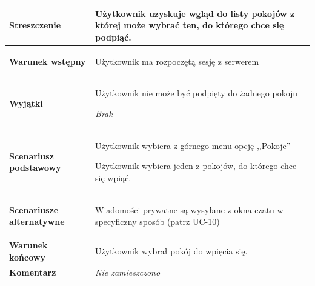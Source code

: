 {\begin{tabular}{ | l | l | }
	\hline
		\parbox[t]{4cm}{\textbf{Streszczenie}} & \parbox[t]{11cm}{
			Użytkownik uzyskuje wgląd do listy pokojów z której może
			wybrać ten, do którego chce się podpiąć.
			
		}\\
		
	\hline
		\parbox[t]{4cm}{\textbf{Warunek wstępny}} & \parbox[t]{11cm}{
			\begin{enumreq}
				\item Użytkownik ma rozpoczętą sesję z serwerem
			\end{enumreq}
				
		}
		\\
		
	\hline
		\parbox[t]{4cm}{\textbf{Wyjątki}} & \parbox[t]{11cm}{
			\begin{enumreq}
				\item Użytkownik nie może być podpięty do żadnego pokoju
			\end{enumreq}
			\textit{Brak}
			
		}
		\\

	\hline
		\parbox[t]{4cm}{\textbf{Scenariusz podstawowy}} & \parbox[t]{11cm}{
			\begin{enumreq}
				\item Użytkownik wybiera z górnego menu opcję ,,Pokoje''
				\item Użytkownik wybiera jeden z pokojów, do którego chce
				się wpiąć.
			\end{enumreq}
		}
		\\
		
	\hline
		\parbox[t]{4cm}{\textbf{Scenariusze alternatywne}} & \parbox[t]
		{11cm}{
			\begin{enumreq}
				\item Wiadomości prywatne są wysyłane z okna czatu w 
				specyficzny sposób (patrz UC-10)
			\end{enumreq}
		}
		\\
		
	\hline
		\parbox[t]{4cm}{\textbf{Warunek końcowy}} & \parbox[t]{11cm}{
			Użytkownik wybrał pokój do wpięcia się.
		}
		\\
		
	\hline
		\parbox[t]{4cm}{\textbf{Komentarz}} & \parbox[t]{11cm}{
			\textit{Nie zamieszczono}
		}
		\\

	\hline
\end{tabular}

\vspace{2em}

}
